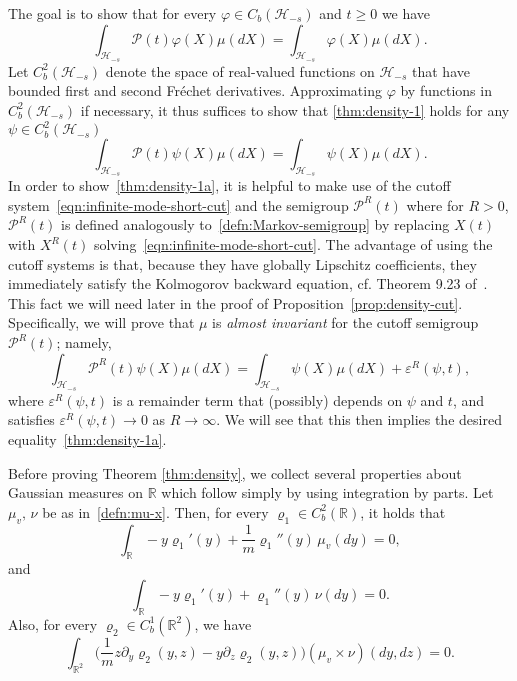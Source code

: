 \documentclass[11pt]{amsart}
\theoremstyle{definition}
\newcommand{\rbb}{\mathbb{R}}
\renewcommand{\H}{\mathcal{H}}
\newcommand{\PMarkov}{\mathcal{P}}
\newcommand{\Hs}{\mathcal{H}_{-s}}
\theoremstyle{definition}
\theoremstyle{plain}
\numberwithin{equation}{section}
\begin{document}
The goal is to show that for every $\varphi\in C_b(\H_{-s})$ and $t\geq 0$ we have
\begin{equation}\label{thm:density-1}
\int_{\mathcal{H}_{-s}}\!\!\!\!\PMarkov(t)\varphi(X)\mu(dX)=\int_{\mathcal{H}_{-s}}\!\!\!\!\varphi(X)\mu(dX).
\end{equation}
Let $C_b^2(\H_{-s})$ denote the space of real-valued functions on $\Hs$ that have bounded first and second Fr\'echet derivatives. Approximating $\varphi$ by functions in $C^2_b(\Hs)$ if necessary, it thus suffices to show that \eqref{thm:density-1} holds for any $\psi\in C_b^2(\H_{-s})$
 \begin{equation}\label{thm:density-1a}
\int_{\mathcal{H}_{-s}}\!\!\!\!\PMarkov(t)\psi(X)\mu(dX)=\int_{\mathcal{H}_{-s}}\!\!\!\!\psi(X)\mu(dX).
\end{equation}
In order to show~\eqref{thm:density-1a}, it is helpful to make use of the cutoff system~\eqref{eqn:infinite-mode-short-cut} and the semigroup $\PMarkov^R(t)$ where for $R>0$, $\PMarkov^R(t)$ is defined analogously to~\eqref{defn:Markov-semigroup} by replacing $X(t)$ with $X^R(t)$ solving~\eqref{eqn:infinite-mode-short-cut}. The advantage of using the cutoff systems is that, because they have globally Lipschitz coefficients, they immediately satisfy the Kolmogorov backward equation, cf. Theorem 9.23 of~\cite{da2014stochastic}.  This fact we will need later in the proof of Proposition~\ref{prop:density-cut}. Specifically, we will prove that $\mu$ is \emph{almost invariant} for the cutoff semigroup $\PMarkov^R(t)$; namely,
\begin{equation}\label{thm:density-2}
\int_{\mathcal{H}_{-s}}\!\!\!\!\PMarkov^R(t)\psi(X)\mu(dX)=\int_{\mathcal{H}_{-s}}\!\!\!\!\psi(X)\mu(dX)+\varepsilon^R(\psi,t),
\end{equation} 
where $\varepsilon^R(\psi,t)$ is a remainder term that (possibly) depends on $\psi$ and $t$, and satisfies $\varepsilon^R(\psi,t)\to 0$ as $R\to \infty$. We will see that this then implies the desired equality~\eqref{thm:density-1a}.

Before proving Theorem \ref{thm:density}, we collect several properties about Gaussian measures on $\rbb$ which follow simply by using integration by parts. Let $\mu_v,\, \nu$ be as in~\eqref{defn:mu-x}. Then, for every  $\varrho_1\in C^2_b(\rbb)$, it holds that
\begin{equation}\label{eqn:Gaussian-0}
\int_\rbb -y\varrho_1'(y)+\frac{1}{m}\varrho_1''(y)\, \mu_v(dy)=0,
\end{equation}
and
\begin{equation}\label{eqn:Gaussian-1}
\int_\rbb -y\varrho_1'(y)+\varrho_1''(y)\, \nu(dy)=0.
\end{equation}
Also, for every $\varrho_2\in C^1_b(\rbb^2)$, we have
\begin{equation}\label{eqn:Gaussian-3}
\int_{\rbb^2}\Big( \frac{1}{m}z\partial_y\varrho_2(y,z)-y\partial_z\varrho_2(y,z)\Big)\left(\mu_v\times\nu\right)(dy,dz)=0.
\end{equation}
\end{document}

